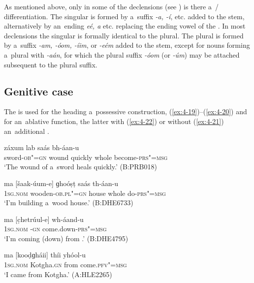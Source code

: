 As mentioned above, only in some of the declensions (see ) is there a~/ differentiation. The singular  is formed by a~suffix \textit{-a, -í}, etc. added to the  stem, alternatively by an~ending \textit{eé, a} etc. replacing the ending vowel of the . In most declensions the  singular is formally identical to the  plural. The  plural is formed by a~suffix \textit{-am, -óom, -íim}, or \textit{-eém} added to the  stem, except for nouns forming a~plural with \textit{-aán}, for which the plural  suffix \textit{-óom} (or \textit{-úm}) may be attached subsequent to the plural suffix.

\subsection{Genitive case}
\label{subsec:4-5-3}

The  is used for the  heading a~possessive construction, (\ref{ex:4-19})--(\ref{ex:4-20}) and for an~ablative function, the latter with (\ref{ex:4-22}) or without (\ref{ex:4-21}) an~additional .


\begin{exe}
\ex
\label{ex:4-19}
\gll [khanɡar-íi-e] záxum lab saás bh-áan-u \\
	sword-\textsc{ob"=gn} wound quickly whole become-\textsc{prs"=msg} \\
\glt `The wound of a~sword heals quickly.' (B:PRB018)
\end{exe}

\begin{exe}
\ex
\label{ex:4-20}
\gll ma [šaak-úum-e] ɡhoóṣṭ saás th-áan-u \\
	\textsc{1sg.nom} wooden-\textsc{ob.pl"=gn} house whole do-\textsc{prs"=msg} \\
\glt `I'm building a~wood house.' (B:DHE6733)
\end{exe}

\begin{exe}
\ex
\label{ex:4-21}
\gll ma [c̣hetrúul-e] wh-áand-u \\
	\textsc{1sg.nom} -\textsc{gn} come.down-\textsc{prs"=msg} \\
\glt `I'm coming (down) from .' (B:DHE4795)
\end{exe}

\begin{exe}
\ex
\label{ex:4-22}
\gll ma [kooḍɡháii] thíi yhóol-u \\
	\textsc{1sg.nom} Kotgha.\textsc{gn} from come.\textsc{pfv"=msg} \\
\glt `I came from Kotgha.' (A:HLE2265)
\end{exe}


